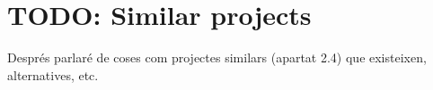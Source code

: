 
\section{TODO: Similar projects}

Després parlaré de coses com projectes similars (apartat 2.4) que existeixen,
alternatives, etc.
